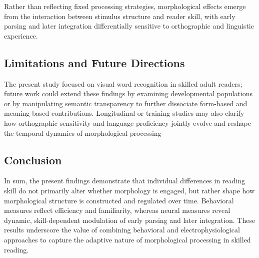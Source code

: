 \documentclass[preprint,12pt, authoryear, review]{elsarticle}
\begin{document}
Rather than reflecting fixed processing strategies, morphological effects emerge from the interaction between stimulus structure and reader skill, with early parsing and later integration differentially sensitive to orthographic and linguistic experience.

\subsection{Limitations and Future Directions}

The present study focused on visual word recognition in skilled adult readers; future work could extend these findings by examining developmental populations or by manipulating semantic transparency to further dissociate form-based and meaning-based contributions. Longitudinal or training studies may also clarify how orthographic sensitivity and language proficiency jointly evolve and reshape the temporal dynamics of morphological processing

\subsection{Conclusion}

In sum, the present findings demonstrate that individual differences in reading skill do not primarily alter whether morphology is engaged, but rather shape how morphological structure is constructed and regulated over time. Behavioral measures reflect efficiency and familiarity, whereas neural measures reveal dynamic, skill-dependent modulation of early parsing and later integration. These results underscore the value of combining behavioral and electrophysiological approaches to capture the adaptive nature of morphological processing in skilled reading.



\end{document}
